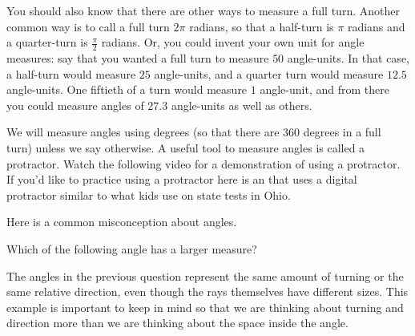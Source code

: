 \documentclass{ximera}
\begin{document}
You should also know that there are other ways to measure a full turn. Another common way is to call a full turn $2\pi$ radians, so that a half-turn is $\pi$ radians and a quarter-turn is $\frac{\pi}{2}$ radians. Or, you could invent your own unit for angle measures: say that you wanted a full turn to measure $50$ angle-units. In that case, a half-turn would measure $25$ angle-units, and a quarter turn would measure $12.5$ angle-units. One fiftieth of a turn would measure $1$ angle-unit, and from there you could measure angles of $27.3$ angle-units as well as others.

We will measure angles using degrees (so that there are $360$ degrees in a full turn) unless we say otherwise.  A useful tool to measure angles is called a protractor. Watch the following video for a demonstration of using a protractor. If you'd like to practice using a protractor here is an  that uses a digital protractor similar to what kids use on state tests in Ohio.




Here is a common misconception about angles.
\begin{question}
Which of the following angle has a larger measure?
\begin{image}
\end{image}

\begin{multipleChoice}
\end{multipleChoice}
\end{question}
The angles in the previous question represent the same amount of turning or the same relative direction, even though the rays themselves have different sizes. This example is important to keep in mind so that we are thinking about turning and direction more than we are thinking about the space inside the angle.
\end{document}
